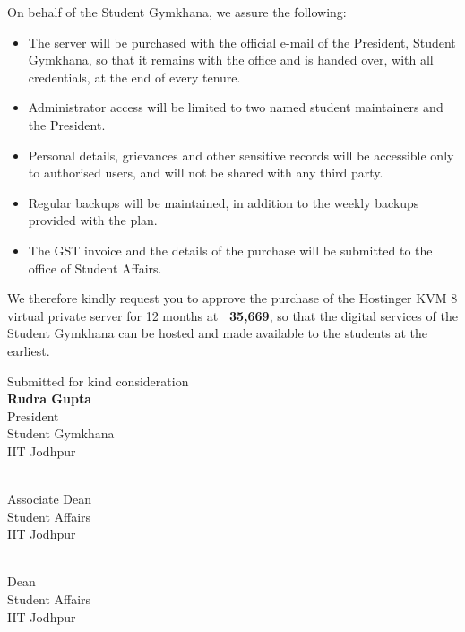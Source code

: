 \documentclass[11pt,letterpaper]{article}
\newcommand{\rs}{{\rupee}}
\newcommand{\PresName}{Rudra Gupta}
\newcommand{\ADname}{Dr. Pranay Ranjan}
\newcommand{\Deanname}{Dr. Rajlaxmi Chouhan}
\newcommand{\subhead}[1]{\par\needspace{4\baselineskip}{\bfseries #1}\par\nopagebreak}
\newcommand{\signature}[3]{%
  \begin{minipage}[t]{0.45\textwidth}\raggedright
  \vspace{1.2cm}{\bfseries #1}\\ #2\\ #3\\ IIT Jodhpur\end{minipage}}
\begin{document}
\subhead{Undertakings}
On behalf of the Student Gymkhana, we assure the following:
\begin{itemize}
  \item The server will be purchased with the official e-mail of the President, Student Gymkhana, so that it remains with the office and is handed over, with all credentials, at the end of every tenure.
  \item Administrator access will be limited to two named student maintainers and the President.
  \item Personal details, grievances and other sensitive records will be accessible only to authorised users, and will not be shared with any third party.
  \item Regular backups will be maintained, in addition to the weekly backups provided with the plan.
  \item The GST invoice and the details of the purchase will be submitted to the office of Student Affairs.
\end{itemize}

We therefore kindly request you to approve the purchase of the Hostinger KVM 8 virtual private server for 12 months at \textbf{\rs~35,669}, so that the digital services of the Student Gymkhana can be hosted and made available to the students at the earliest.

\clearpage
\begin{flushright}
  {\small Submitted for kind consideration}\\[1.2cm]
  {\large\bfseries \PresName}\\
  President\\
  Student Gymkhana\\
  IIT Jodhpur
\end{flushright}

\noindent\signature{\ADname}{Associate Dean}{Student Affairs}\par
\noindent\signature{\Deanname}{Dean}{Student Affairs}
\end{document}
